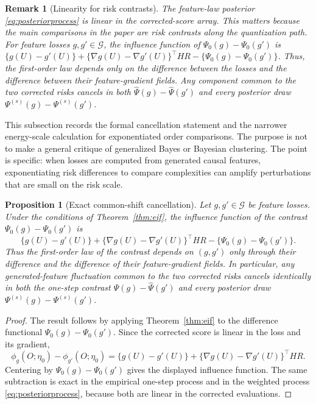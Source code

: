 \documentclass[11pt]{article}
\newtheorem{proposition}{Proposition}
\newtheorem{remark}{Remark}
\newcommand{\calG}{\mathcal G}
\newcommand{\hPsi}{\widehat\Psi}
\begin{document}
\begin{remark}[Linearity for risk contrasts]\label{rem:whynot}
    The feature-law posterior \eqref{eq:posteriorprocess} is linear in the corrected-score array.  This matters because the main comparisons in the paper are risk contrasts along the quantization path.  For feature losses $g,g'\in\calG$, the influence function of $\Psi_0(g)-\Psi_0(g')$ is $\{g(U)-g'(U)\} + \{\nabla g(U)-\nabla g'(U)\}^{\top}HR - \{\Psi_0(g)-\Psi_0(g')\}$.
    Thus, the first-order law depends only on the difference between the losses and the difference between their feature-gradient fields. Any component common to the two corrected risks cancels in both $\hPsi(g)-\hPsi(g')$ and every posterior draw $\Psi^{(s)}(g)-\Psi^{(s)}(g')$.
\end{remark}

This subsection records the formal cancellation statement and the narrower energy-scale calculation for exponentiated order comparisons.  The purpose is not to make a general critique of generalized Bayes \cite{bissiri2016} or Bayesian clustering.  The point is specific: when losses are computed from generated causal features, exponentiating risk differences to compare complexities can amplify perturbations that are small on the risk scale.

\begin{proposition}[Exact common-shift cancellation]\label{prop:cancellation}
Let $g,g'\in\calG$ be feature losses.  Under the conditions of Theorem~\ref{thm:eif}, the influence function of the contrast $\Psi_0(g)-\Psi_0(g')$ is
\[
\{g(U)-g'(U)\}
+
\{\nabla g(U)-\nabla g'(U)\}^\top HR
-
\{\Psi_0(g)-\Psi_0(g')\}.
\]
Thus the first-order law of the contrast depends on $(g,g')$ only through their difference and the difference of their feature-gradient fields.  In particular, any generated-feature fluctuation common to the two corrected risks cancels identically in both the one-step contrast $\hPsi(g)-\hPsi(g')$ and every posterior draw $\Psi^{(s)}(g)-\Psi^{(s)}(g')$.
\end{proposition}

\begin{proof}
The result follows by applying Theorem~\ref{thm:eif} to the difference functional $\Psi_0(g)-\Psi_0(g')$.  Since the corrected score is linear in the loss and its gradient,
\[
\phi_g(O;\eta_0)-\phi_{g'}(O;\eta_0)
=
\{g(U)-g'(U)\}
+
\{\nabla g(U)-\nabla g'(U)\}^\top HR .
\]
Centering by $\Psi_0(g)-\Psi_0(g')$ gives the displayed influence function.  The same subtraction is exact in the empirical one-step process and in the weighted process \eqref{eq:posteriorprocess}, because both are linear in the corrected evaluations.
\end{proof}
\end{document}
